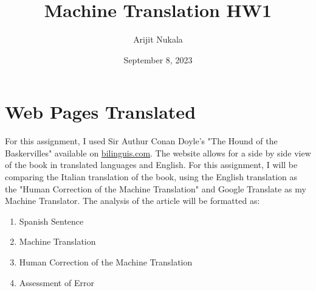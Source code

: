 \documentclass{article}
\title{Machine Translation HW1}
\author{Arijit Nukala}
\date{September 8, 2023}
\begin{document}
\maketitle

\section{Web Pages Translated}
For this assignment, I used Sir Authur Conan Doyle's "The Hound of the Baskervilles" available
on \href{bilinguis.com}{bilinguis.com}. The website allows for a side by side view of the book
in translated languages and English. For this assignment, I will be comparing the Italian
translation of the book, using the English translation as the "Human Correction of the Machine
Translation" and Google Translate as my Machine Translator.
The analysis of the article will be formatted as:
\begin{enumerate}[label=(\alph*)]
    \item Spanish Sentence
    \item Machine Translation
    \item Human Correction of the Machine Translation
    \item Assessment of Error
\end{enumerate}
\end{document}
